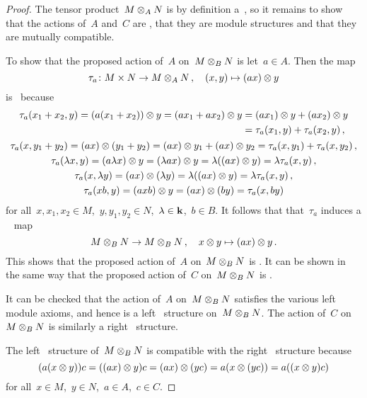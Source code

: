 \begin{proof}
  The tensor product~$M \otimes_A N$ is by definition a~{\module{$\kf$}}, so it remains to show that the actions of~$A$ and~$C$ are {\welldef}, that they are module structures and that they are mutually compatible.
  
  To show that the proposed action of~$A$ on~$M \otimes_B N$ is {\welldef} let~$a \in A$.
  Then the map
  \[
            \tau_a
    \colon  M \times N
    \to     M \otimes_A N \,,
    \quad   (x,y)
    \mapsto (ax) \otimes y
  \]
  is~{} because
  \begin{gather*}
    \begin{aligned}
          \tau_a(x_1 + x_2, y)
       =  (a(x_1 + x_2)) \otimes y
       =  (a x_1 + a x_2) \otimes y
      &=  (a x_1) \otimes y + (a x_2) \otimes y \\
      &=  \tau_a(x_1, y) + \tau_a(x_2, y) \,,
    \end{aligned}
  \\
      \tau_a(x, y_1 + y_2)
    = (ax) \otimes (y_1 + y_2)
    = (ax) \otimes y_1 + (ax) \otimes y_2
    = \tau_a(x, y_1) + \tau_a(x, y_2) \,,
  \\
      \tau_a(\lambda x, y)
    = (a \lambda x) \otimes y
    = (\lambda a x) \otimes y
    = \lambda ((ax) \otimes y)
    = \lambda \tau_a(x,y) \,,
  \\
      \tau_a(x, \lambda y)
    = (ax) \otimes (\lambda y)
    = \lambda ((ax) \otimes y)
    = \lambda \tau_a(x,y) \,,
  \\
      \tau_a(xb,y)
    = (axb) \otimes y
    = (ax) \otimes (by)
    = \tau_a(x,by)
  \end{gather*}
  for all~$x, x_1, x_2 \in M$,~$y, y_1, y_2 \in N$,~$\lambda \in \mathbf{k}$,~$b \in B$.
  It follows that that~$\tau_a$ induces a {\welldef}~{\klin} map
  \[
            M \otimes_B N
    \to     M \otimes_B N \,,
    \quad   x \otimes y
    \mapsto (ax) \otimes y \,.
  \]
  This shows that the proposed action of~$A$ on~$M \otimes_B N$ is {\welldef}.
  It can be shown in the same way that the proposed action of~$C$ on~$M \otimes_B N$ is {\welldef}.
  
  It can be checked that the action of~$A$ on~$M \otimes_B N$ satisfies the various left module axioms, and hence is a left~{} structure on~$M \otimes_B N$.
  The action of~$C$ on~$M \otimes_B N$ is similarly a right~{} structure.
  
  The left~{} structure of~$M \otimes_B N$ is compatible with the right~{} structure because
  \[
      ( a(x \otimes y) )c
    = ((ax) \otimes y)c
    = (ax) \otimes (yc)
    = a( x \otimes (yc) )
    = a( (x \otimes y)c )
  \]
  for all~$x \in M$,~$y \in N$,~$a \in A$,~$c \in C$.
\end{proof}


